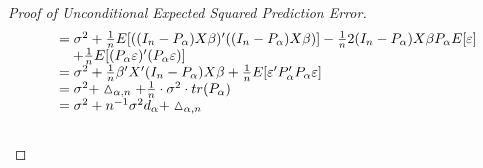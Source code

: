 \documentclass[Research_Module_ES.tex]{subfiles}
\begin{document}
\begin{proof}[Proof of Unconditional Expected Squared Prediction Error]
\begin{align*}
\begin{tabular}{ll}
	&$=\sigma^2+\frac{1}{n}E[((I_n-P_\alpha)X\beta)^\prime((I_n-P_\alpha)X\beta)]-\frac{1}{n}2(I_n-P_\alpha)X\beta P_\alpha E[\varepsilon]$\\
	&$~~~+\frac{1}{n}E[(P_\alpha\varepsilon)^\prime (P_\alpha\varepsilon)]$\\
	&$=\sigma^2+\frac{1}{n}\beta^\prime X^\prime (I_n-P_\alpha)X\beta+\frac{1}{n}E[\varepsilon^\prime P_\alpha^\prime P_\alpha\varepsilon]$\\
	&$=\sigma^2+\vartriangle_{\alpha,n}+\frac{1}{n}\cdot\sigma^2\cdot tr(P_\alpha)$\\
	&$=\sigma^2+n^{-1}\sigma^2d_\alpha+\vartriangle_{\alpha,n}$
	\end{tabular}
	\end{align*}\\
\end{proof}	
\end{document}
